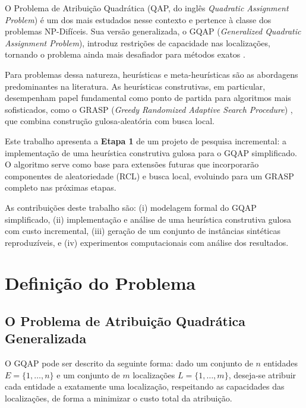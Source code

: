 \documentclass[12pt]{article}
\begin{document}
O Problema de Atribuição Quadrática (QAP, do inglês \textit{Quadratic
Assignment Problem}) é um dos mais estudados nesse contexto e pertence à classe
dos problemas NP-Difíceis. Sua versão generalizada, o GQAP (\textit{Generalized
Quadratic Assignment Problem}), introduz restrições de capacidade nas
localizações, tornando o problema ainda mais desafiador para métodos exatos
\cite{cordeau:2006}.

\cite{mateus2011grasp}

Para problemas dessa natureza, heurísticas e meta-heurísticas são as abordagens
predominantes na literatura. As heurísticas construtivas, em particular,
desempenham papel fundamental como ponto de partida para algoritmos mais
sofisticados, como o GRASP (\textit{Greedy Randomized Adaptive Search
Procedure}) \cite{resende:2011}, que combina construção gulosa-aleatória com
busca local.

Este trabalho apresenta a \textbf{Etapa 1} de um projeto de pesquisa incremental:
a implementação de uma heurística construtiva gulosa para o GQAP simplificado.
O algoritmo serve como base para extensões futuras que incorporarão componentes
de aleatoriedade (RCL) e busca local, evoluindo para um GRASP completo nas
próximas etapas.

As contribuições deste trabalho são: (i) modelagem formal do GQAP simplificado,
(ii) implementação e análise de uma heurística construtiva gulosa com custo
incremental, (iii) geração de um conjunto de instâncias sintéticas reproduzíveis,
e (iv) experimentos computacionais com análise dos resultados.


\section{Definição do Problema}

\subsection{O Problema de Atribuição Quadrática Generalizada}

O GQAP pode ser descrito da seguinte forma: dado um conjunto de $n$ entidades
$E = \{1, \ldots, n\}$ e um conjunto de $m$ localizações $L = \{1, \ldots, m\}$,
deseja-se atribuir cada entidade a exatamente uma localização, respeitando as
capacidades das localizações, de forma a minimizar o custo total da atribuição.
\end{document}
